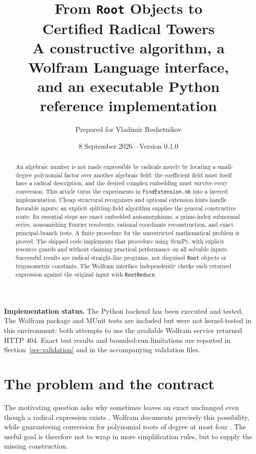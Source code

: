\documentclass[11pt,letterpaper]{article}
\title{\textbf{From \texttt{Root} Objects to\protect\\ Certified Radical Towers}\large\protect\\[6pt]
A constructive algorithm, a Wolfram Language interface,\protect\\and an executable Python reference implementation}
\author{Prepared for Vladimir Reshetnikov}
\date{8 September 2026\quad---\quad Version 0.1.0}
\theoremstyle{definition}\newtheorem{definition}[theorem]{Definition}
\theoremstyle{remark}\newtheorem{remark}[theorem]{Remark}
\begin{document}
\maketitle
\begin{abstract}
An algebraic number is not made expressible by radicals merely by locating a
small-degree polynomial factor over another algebraic field: the coefficient
field must itself have a radical description, and the desired complex embedding
must survive every conversion. This article turns the experiments in
\texttt{FindExtension.nb} into a layered implementation. Cheap structural
recognizers and optional extension hints handle favorable inputs; an explicit
splitting-field algorithm supplies the general constructive route. Its essential
steps are exact embedded automorphisms, a prime-index subnormal series,
nonvanishing Fourier resolvents, rational coordinate reconstruction, and exact
principal-branch tests. A finite procedure for the unrestricted mathematical
problem is proved. The shipped code implements that procedure using SymPy,
with explicit resource guards and without claiming practical performance on
all solvable inputs. Successful results are radical straight-line programs,
not disguised \texttt{Root} objects or trigonometric constants. The Wolfram
interface independently checks each returned expression against the original
input with \texttt{RootReduce}.
\end{abstract}
\vspace{6pt}
\textbf{Implementation status.} The Python backend has been executed and tested.
The Wolfram package and MUnit tests are included but were not kernel-tested in
this environment: both attempts to use the available Wolfram service returned
HTTP 404. Exact test results and bounded-run limitations are reported in
Section~\ref{sec:validation} and in the accompanying validation files.
\tableofcontents
\newpage

\section{The problem and the contract}
\label{sec:contract}
The motivating question asks why  sometimes leaves an exact
 unchanged even though a radical expression exists
\cite{question}. Wolfram documents precisely this possibility, while guaranteeing
conversion for polynomial roots of degree at most four \cite{toradicals}.
The useful goal is therefore not to wrap  in more simplification
rules, but to supply the missing construction.
\end{document}
